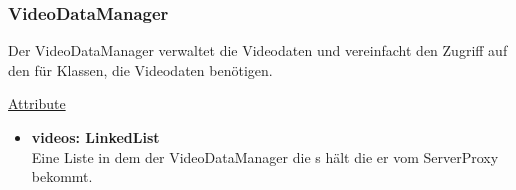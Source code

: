 \newpage
\subsubsection{VideoDataManager}\label{VideoDataManager}
Der VideoDataManager verwaltet die Videodaten und vereinfacht den Zugriff auf den  für Klassen, die Videodaten benötigen. \newline

\underline{Attribute}
\begin{itemize}
\itemsep0pt

\item \textbf{videos: LinkedList}\hfill\\
Eine Liste in dem der VideoDataManager die s hält die er vom ServerProxy bekommt.
\end{itemize}

